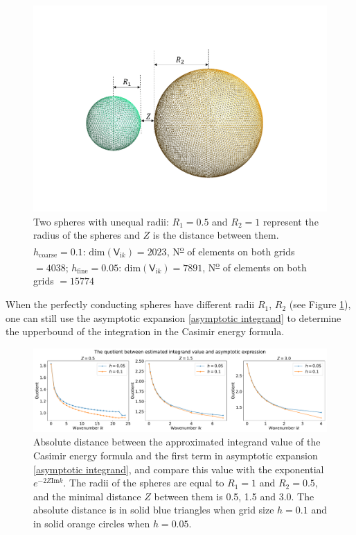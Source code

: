 \begin{figure}[H]
    \hspace*{2cm}\includegraphics[scale = 0.6]{figures/Grid_two_spheres_unequal_radii.png}
    \caption{Two spheres with unequal radii: $R_{1} = 0.5$ and $R_{2} = 1$ represent the radius of the spheres and $Z$ is the distance between them.
    $h_{\text{coarse}} = 0.1$: $\text{dim}(\mathsf{V}_{\mathrm{i}k}) = 2023$,  N\textsuperscript{\underline{o}} of elements on both grids $ = 4038$;
    $h_{\text{fine}} = 0.05$: $\text{dim}(\mathsf{V}_{\mathrm{i}k}) = 7891$,  N\textsuperscript{\underline{o}} of elements on both grids $ = 15774$}
    \label{Two spheres with unequal radii}
\end{figure}

When the perfectly conducting spheres have different radii $R_{1}$, $R_{2}$ (see Figure \ref{Two spheres with unequal radii}), one can still use the 
asymptotic expansion \eqref{asymptotic integrand} to determine the upperbound of the integration in the Casimir energy formula. 

    \begin{figure}[H]
        \centering
        \hspace*{-1.4cm}\includegraphics[scale = 0.37]{figures/rel_err_unequal.pdf}
        \caption{Absolute distance between the approximated integrand value of the Casimir energy formula and the first term in 
        asymptotic expansion \eqref{asymptotic integrand}, and compare this value with the exponential $e^{-2Z\text{Im}k}$. The radii of the spheres are equal to 
        $R_{1} = 1$ and $R_{2} = 0.5$, and the minimal distance $Z$ between them is 0.5, 1.5 and 3.0. The absolute distance is in solid blue triangles when grid size 
        $h = 0.1$ and in solid orange circles when $h = 0.05$.}
        \label{Abs unequal}
    \end{figure}

